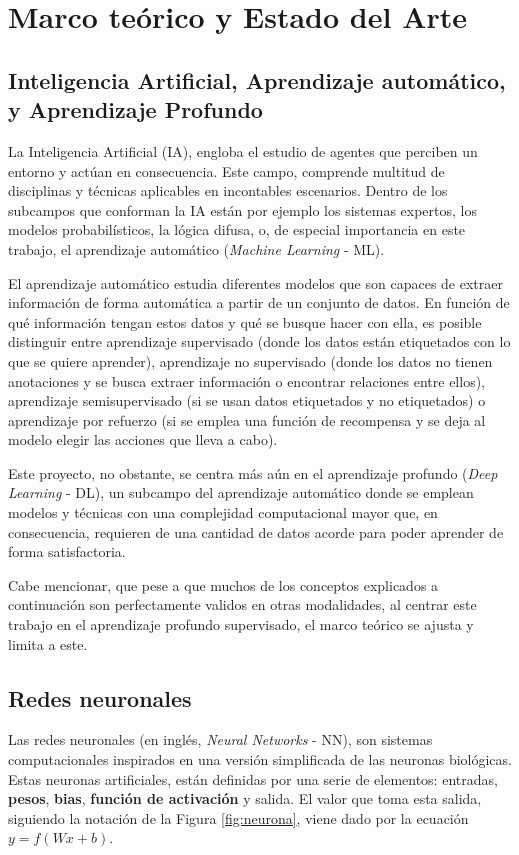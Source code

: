 \section{Marco teórico y Estado del Arte}

\subsection{Inteligencia Artificial, Aprendizaje automático, y Aprendizaje Profundo}
La Inteligencia Artificial (IA), engloba el estudio de agentes que perciben un entorno y actúan en consecuencia. Este campo, comprende multitud de disciplinas y técnicas aplicables en incontables escenarios. Dentro de los subcampos que conforman la IA están por ejemplo los sistemas expertos, los modelos probabilísticos, la lógica difusa, o, de especial importancia en este trabajo, el aprendizaje automático (\textit{Machine Learning} - ML). 

El aprendizaje automático estudia diferentes modelos que son capaces de extraer información de forma automática a partir de un conjunto de datos. En función de qué información tengan estos datos y qué se busque hacer con ella, es posible distinguir entre aprendizaje supervisado (donde los datos están etiquetados con lo que se quiere aprender), aprendizaje no supervisado (donde los datos no tienen anotaciones y se busca extraer información o encontrar relaciones entre ellos), aprendizaje semisupervisado (si se usan datos etiquetados y no etiquetados) o aprendizaje por refuerzo (si se emplea una función de recompensa y se deja al modelo elegir las acciones que lleva a cabo).

Este proyecto, no obstante, se centra más aún en el aprendizaje profundo (\textit{Deep Learning} - DL), un subcampo del aprendizaje automático donde se emplean modelos y técnicas con una complejidad computacional mayor que, en consecuencia, requieren de una cantidad de datos acorde para poder aprender de forma satisfactoria.

Cabe mencionar, que pese a que muchos de los conceptos explicados a continuación son perfectamente validos en otras modalidades, al centrar este trabajo en el aprendizaje profundo supervisado, el marco teórico se ajusta y limita a este. 

\subsection{Redes neuronales}
Las redes neuronales (en inglés, \textit{Neural Networks} - NN), son sistemas computacionales inspirados en una versión simplificada de las neuronas biológicas. Estas neuronas artificiales, están definidas por una serie de elementos: entradas, \textbf{pesos}, \textbf{bias}, \textbf{función de activación} y salida. El valor que toma esta salida, siguiendo la notación de la Figura \ref{fig:neurona}, viene dado por la ecuación $y = f(Wx + b)$.

